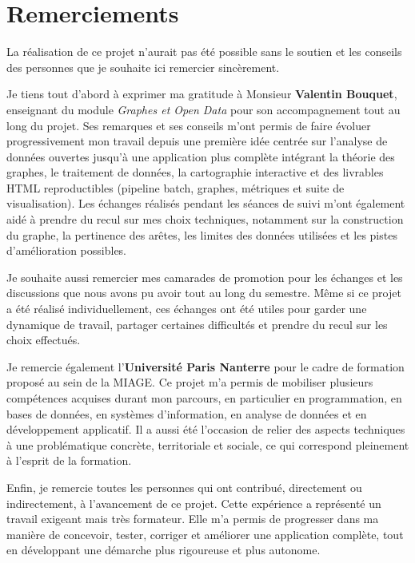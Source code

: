 \documentclass[12pt,a4paper,oneside]{article}
\begin{document}
\clearpage

\section*{Remerciements}

La réalisation de ce projet n'aurait pas été possible sans le soutien et les conseils des personnes que je souhaite ici remercier sincèrement.

Je tiens tout d'abord à exprimer ma gratitude à Monsieur \textbf{Valentin Bouquet}, enseignant du module \emph{Graphes et Open Data} pour son accompagnement tout au long du projet. Ses remarques et ses conseils m'ont permis de faire évoluer progressivement mon travail depuis une première idée centrée sur l'analyse de données ouvertes jusqu'à une application plus complète intégrant la théorie des graphes, le traitement de données, la cartographie interactive et des livrables HTML reproductibles (pipeline batch, graphes, métriques et suite de visualisation). Les échanges réalisés pendant les séances de suivi m'ont également aidé à prendre du recul sur mes choix techniques, notamment sur la construction du graphe, la pertinence des arêtes, les limites des données utilisées et les pistes d'amélioration possibles.

Je souhaite aussi remercier mes camarades de promotion pour les échanges et les discussions que nous avons pu avoir tout au long du semestre. Même si ce projet a été réalisé individuellement, ces échanges ont été utiles pour garder une dynamique de travail, partager certaines difficultés et prendre du recul sur les choix effectués.

Je remercie également l'\textbf{Université Paris Nanterre} pour le cadre de formation proposé au sein de la MIAGE. Ce projet m'a permis de mobiliser plusieurs compétences acquises durant mon parcours, en particulier en programmation, en bases de données, en systèmes d'information, en analyse de données et en développement applicatif. Il a aussi été l'occasion de relier des aspects techniques à une problématique concrète, territoriale et sociale, ce qui correspond pleinement à l'esprit de la formation.

Enfin, je remercie toutes les personnes qui ont contribué, directement ou indirectement, à l'avancement de ce projet. Cette expérience a représenté un travail exigeant mais très formateur. Elle m'a permis de progresser dans ma manière de concevoir, tester, corriger et améliorer une application complète, tout en développant une démarche plus rigoureuse et plus autonome.
\end{document}
